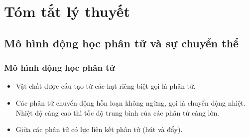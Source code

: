\chapter{Tóm tắt lý thuyết}
\section{Mô hình động học phân tử và sự chuyển thể}
\subsection{Mô hình động học phân tử}
\begin{itemize}
	\item Vật chất được cấu tạo từ các hạt riêng biệt gọi là phân tử.
	\item Các phân tử chuyển động hỗn loạn không ngừng, gọi là chuyển động nhiệt. Nhiệt độ càng cao thì tốc độ trung bình của các phân tử càng lớn.
	\item Giữa các phân tử có lực liên kết phân tử (hút và đẩy).
\end{itemize}
